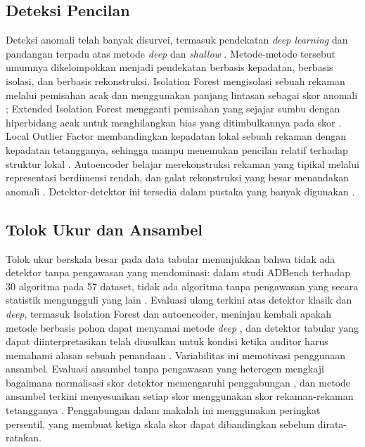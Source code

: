 \documentclass[conference]{IEEEtran}
\begin{document}
\subsection{Deteksi Pencilan}
Deteksi anomali telah banyak disurvei, termasuk pendekatan \textit{deep learning} \cite{pang2021deep} dan pandangan terpadu atas metode \textit{deep} dan \textit{shallow} \cite{ruff2021unifying}. Metode-metode tersebut umumnya dikelompokkan menjadi pendekatan berbasis kepadatan, berbasis isolasi, dan berbasis rekonstruksi. Isolation Forest mengisolasi sebuah rekaman melalui pemisahan acak dan menggunakan panjang lintasan sebagai skor anomali \cite{liu2008iforest}; Extended Isolation Forest mengganti pemisahan yang sejajar sumbu dengan hiperbidang acak untuk menghilangkan bias yang ditimbulkannya pada skor \cite{hariri2021eif}. Local Outlier Factor membandingkan kepadatan lokal sebuah rekaman dengan kepadatan tetangganya, sehingga mampu menemukan pencilan relatif terhadap struktur lokal \cite{breunig2000lof}. Autoencoder belajar merekonstruksi rekaman yang tipikal melalui representasi berdimensi rendah, dan galat rekonstruksi yang besar menandakan anomali \cite{pang2021deep,ruff2021unifying}. Detektor-detektor ini tersedia dalam pustaka yang banyak digunakan \cite{scikit-learn,chen2024pyod2}.

\subsection{Tolok Ukur dan Ansambel}
Tolok ukur berskala besar pada data tabular menunjukkan bahwa tidak ada detektor tanpa pengawasan yang mendominasi: dalam studi ADBench terhadap 30 algoritma pada 57 dataset, tidak ada algoritma tanpa pengawasan yang secara statistik mengungguli yang lain \cite{han2022adbench}. Evaluasi ulang terkini atas detektor klasik dan \textit{deep}, termasuk Isolation Forest dan autoencoder, meninjau kembali apakah metode berbasis pohon dapat menyamai metode \textit{deep} \cite{mehta2024benchmark}, dan detektor tabular yang dapat diinterpretasikan telah diusulkan untuk kondisi ketika auditor harus memahami alasan sebuah penandaan \cite{chang2023diad}. Variabilitas ini memotivasi penggunaan ansambel. Evaluasi ansambel tanpa pengawasan yang heterogen mengkaji bagaimana normalisasi skor detektor memengaruhi penggabungan \cite{kluttermann2023ensembles}, dan metode ansambel terkini menyesuaikan setiap skor menggunakan skor rekaman-rekaman tetangganya \cite{yang2024regional}. Penggabungan dalam makalah ini menggunakan peringkat persentil, yang membuat ketiga skala skor dapat dibandingkan sebelum dirata-ratakan.
\end{document}
